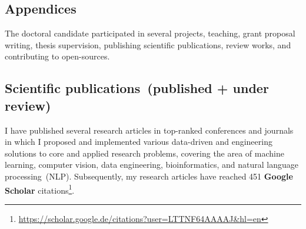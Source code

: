 \begin{appendices}
\section*{Appendices}
The doctoral candidate participated in several projects, teaching, grant proposal writing, thesis supervision, publishing scientific publications, review works, and contributing to open-sources. 

\iffalse
\subsection*{Project works}
The doctoral candidate participated in the following research projects at Fraunhofer FIT. Besides he was involved in other project works jointly done at Fraunhofer FIT and RWTH Aachen University:

\begin{enumerate}[noitemsep]
    \item German Medical Informatics BMBF projects
    \item DEMETER: Building an Interoperable, Data-Driven, Innovative and Sustainable European Agri-Food Sector~(Grant agreement ID: 857202)
    \item Data Scientist Basic Level~(900362). 
\end{enumerate}  

\subsection*{Project proposal writing}
The doctoral candidate participated in the following research projects at Fraunhofer FIT during his studies. Besides he was involve in collaborative projects between Fraunhofer FIT and RWTH Aachen University: 

\begin{enumerate}[noitemsep]
    \item H2020- Digital diagnostics – developing tools for supporting clinical decisions by integrating various diagnostic data~(SC1-BHC-06-2020)
    \item CORD
    \item POLAR.
\end{enumerate}  
\fi 

\subsection*{Scientific publications~(published + under review)}
I have published several research articles in top-ranked conferences and journals in which I proposed and implemented various data-driven and engineering solutions to core and applied research problems, covering the area of machine learning, computer vision, data engineering, bioinformatics, and natural language processing~(NLP). Subsequently, my research articles have reached 451 \textbf{Google Scholar} citations\footnote{\url{https://scholar.google.de/citations?user=LTTNF64AAAAJ&hl=en}}. 


\end{appendices}

